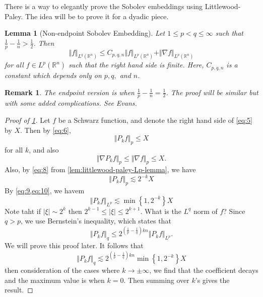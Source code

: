 \documentclass{article}
\newtheorem{lemma}{Lemma}
\newtheorem{remark}{Remark}
\def\R{\mathbb{R}} %
\newcommand{\norm}[1]{\Vert #1 \Vert }
\begin{document}
There is a way to elegantly prove the Sobolev embeddings using Littlewood-Paley.
The idea will be to prove it for a dyadic piece.
\begin{lemma}[Non-endpoint Sobolev Embedding]
  \label{lem:non-endpoint-sobolev-embedding}
  Let $1 \leq p<q \leq \infty$ such that $\frac{1}{p}-\frac{1}{n}>\frac{1}{2}$.
  Then
  \begin{equation}\label{eq:5}
    \norm{f}_{L^{q}(\R^n)} \leq C_{p,q,n} \norm{f}_{L^{p}(\R^n)} + \norm{\nabla f}_{L^{p}(\R^n)}
  \end{equation}
  for all $f\in L^{p}(\R^n)$ such that the right hand side is finite. Here,
  $C_{p,q,n}$ is a constant which depends only on $p,q,$ and $n$. 
\end{lemma}
\begin{remark}
  The endpoint version is when $\frac{1}{p}-\frac{1}{n}=\frac{1}{2}$.  The proof
  will be similar but with some added complications. See Evans.
\end{remark}
\begin{proof}[Proof of \cref{lem:non-endpoint-sobolev-embedding}]
  Let $f$ be a Schwarz function, and denote the right hand side of \cref{eq:5}
  by $X$. Then by \cref{eq:6},
  \begin{equation}\label{eq:10}
    \norm{P_{k}f}_{p} \leq  X 
  \end{equation}
  for all $k$, and also
  \begin{equation*}
    \norm{\nabla P_{k}f}_{p} \leq \norm{\nabla f}_{p} \leq  X.
  \end{equation*}
  Also, by \cref{eq:8} from \cref{lem:littlewood-paley-Lp-lemma}, we have
  \begin{equation}\label{eq:9}
    \norm{P_{k}f}_{p} \lesssim 2^{-k} X
  \end{equation}
  By \cref{eq:9,eq:10}, we havem
  \begin{equation*}
    \norm{P_{k}f}_{ L^{p}} \lesssim \min \left\{1,2^{-k}\right\}X
  \end{equation*}
  Note taht if $|\xi|\sim 2^{k}$ then $2^{k-1} \leq |\xi| \leq 2^{k+1}$. What is
  the $L^{q}$ norm of $f$? Since $q>p$,  we use Bernstein's inequality, which
  states that
  \begin{equation*}
    \norm{P_{k}f}_{q} \leq 2^{\left( \frac{1}{p}-\frac{1}{q} \right)kn }\norm{P_{k}f}_{L^{p}}.
  \end{equation*}
  We will prove this proof later. It follows that
  \begin{equation*}
    \norm{P_{k}f}_{q} \lesssim 2^{\left( \frac{1}{p}-\frac{1}{q} \right)kn }\min \left\{1,2^{-k}\right\}X
  \end{equation*}
  then consideration of the cases where $k\to \pm \infty$, we find that the
  coefficient decays and the maximum value is when $k=0$. Then summing over
  $k$'s gives the result.
\end{proof}
\end{document}
